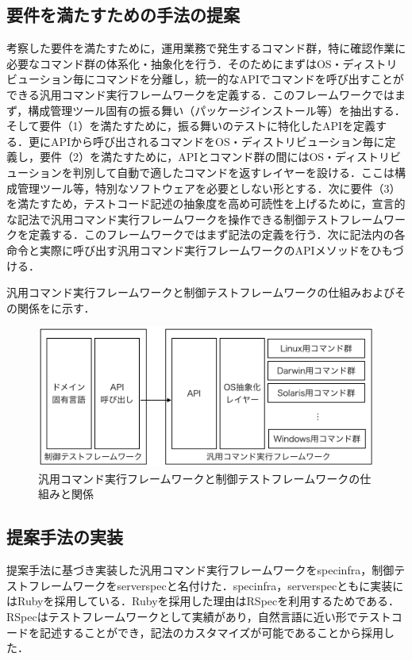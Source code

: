 \subsection{要件を満たすための手法の提案}

考察した要件を満たすために，運用業務で発生するコマンド群，特に確認作業に必要なコマンド群の体系化・抽象化を行う．そのためにまずはOS・ディストリビューション毎にコマンドを分離し，統一的なAPIでコマンドを呼び出すことができる汎用コマンド実行フレームワークを定義する．このフレームワークではまず，構成管理ツール固有の振る舞い（パッケージインストール等）を抽出する．そして要件（1）を満たすために，振る舞いのテストに特化したAPIを定義する．更にAPIから呼び出されるコマンドをOS・ディストリビューション毎に定義し，要件（2）を満たすために，APIとコマンド群の間にはOS・ディストリビューションを判別して自動で適したコマンドを返すレイヤーを設ける．ここは構成管理ツール等，特別なソフトウェアを必要としない形とする．次に要件（3）を満たすため，テストコード記述の抽象度を高め可読性を上げるために，宣言的な記法で汎用コマンド実行フレームワークを操作できる制御テストフレームワークを定義する．このフレームワークではまず記法の定義を行う．次に記法内の各命令と実際に呼び出す汎用コマンド実行フレームワークのAPIメソッドをひもづける．

汎用コマンド実行フレームワークと制御テストフレームワークの仕組みおよびその関係をに示す．

\begin{figure}[tb]
  \includegraphics{framework-overview.png}
  \caption{汎用コマンド実行フレームワークと制御テストフレームワークの仕組みと関係}
  \label{fig:framework}
\end{figure}

\subsection{提案手法の実装}

提案手法に基づき実装した汎用コマンド実行フレームワークをspecinfra\cite{specinfra}，制御テストフレームワークをserverspec\cite{serverspec}と名付けた．specinfra，serverspecともに実装にはRubyを採用している．Rubyを採用した理由はRSpecを利用するためである．RSpecはテストフレームワークとして実績があり，自然言語に近い形でテストコードを記述することができ，記法のカスタマイズが可能であることから採用した．

